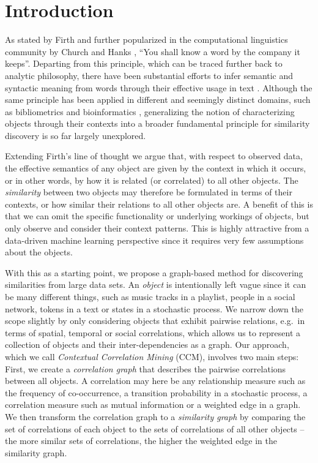 \documentclass[conference]{IEEEtran}
\begin{document}

\section{Introduction}
\label{sec:introduction}

As stated by Firth \cite{Firth57} and further popularized in the computational linguistics community by Church and
Hanks \cite{Church90}, ``You shall know a word by the company it keeps''. Departing from this principle, which can be 
traced further back to analytic philosophy, there have been substantial efforts to infer semantic and syntactic meaning
 from words through their effective usage in text \cite{Harispe2015}. Although the same principle has been applied in 
 different and seemingly distinct domains, such as bibliometrics  \cite{Kessler1963} and bioinformatics 
 \cite{ravasz2002hierarchical}, generalizing the notion of characterizing objects through 
their contexts into a broader fundamental principle for similarity discovery is so far largely unexplored.

Extending Firth's line of thought we argue that, with respect to observed data, the effective semantics of any object are given 
by the context in which it occurs, or in other words, by how it is related (or correlated) to all other objects. The \emph{similarity} 
between two objects may therefore be formulated in terms of their contexts, or how similar their relations to all other
objects are. %
A benefit of this is that we can omit the specific functionality or underlying workings of objects, but
only observe and consider their context patterns. This is highly attractive from a data-driven machine learning
perspective since it requires very few assumptions about the objects.

With this as a starting point, we propose a graph-based method for discovering similarities from large data
sets. An \emph{object} is intentionally left vague since it can be many different things, such as
music tracks in a playlist, people in a social network, tokens in a text or states in a stochastic process. We narrow down the scope
slightly by only considering objects that exhibit pairwise relations, e.g.\ in terms of spatial, temporal or social
correlations, which allows us to represent a collection of objects and their inter-dependencies as a graph. Our
approach, which we call \emph{Contextual Correlation Mining} (CCM), involves two main steps: First, we create a \emph{correlation graph} 
that describes the pairwise correlations between all objects. A correlation may here be any relationship measure such as the frequency 
of co-occurrence, a transition probability in a stochastic process, a correlation measure such as mutual information or a weighted edge in a graph. 
We then transform the correlation graph to a \emph{similarity graph} by comparing the set of correlations of each object
to the sets of correlations of all other objects -- the more similar sets of correlations, the higher the weighted edge in the
similarity graph.
\end{document}
